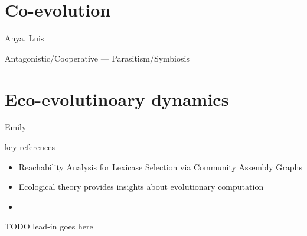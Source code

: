 \section{Co-evolution}
Anya, Luis

Antagonistic/Cooperative --- Parasitism/Symbiosis

\section{Eco-evolutinoary dynamics}
\label{sec:ecology}
Emily

key references
\begin{itemize}
  \item Reachability Analysis for Lexicase Selection via Community Assembly Graphs \citep{dolson2024reachability}
  \item Ecological theory provides insights about evolutionary computation \citep{dolson2018ecological}
  \item
\end{itemize}

TODO lead-in goes here




